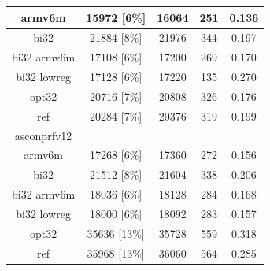 \documentclass[12pt,a4paper,italian]{report}
\begin{document}
\begin{table}[h]
\begin{tabular}{|c|c|c|c|c|}
        \hline
        armv6m & 15972 [6\%] & 16064 & 251 & 0.136 \\
        \hline
        bi32 & 21884 [8\%] & 21976 & 344 & 0.197 \\
        \hline
        bi32 armv6m & 17108 [6\%] & 17200 & 269 & 0.170 \\
        \hline
        bi32 lowreg & 17128 [6\%] & 17220 & 135 & 0.270 \\
        \hline
        opt32 & 20716 [7\%] & 20808 & 326 & 0.176 \\
        \hline
        ref & 20284 [7\%] & 20376 & 319 & 0.199 \\
        \hline
        asconprfv12 & & & & \\
        \hline
        armv6m & 17268 [6\%] & 17360 & 272 & 0.156 \\
        \hline
        bi32 & 21512 [8\%] & 21604 & 338 & 0.206 \\
        \hline
        bi32 armv6m & 18036 [6\%] & 18128 & 284 & 0.168 \\
        \hline
        bi32 lowreg & 18000 [6\%] & 18092 & 283 & 0.157 \\
        \hline
        opt32 & 35636 [13\%] & 35728 & 559 & 0.318 \\
        \hline
        ref & 35968 [13\%] & 36060 & 564 & 0.285 \\
        \hline
    \end{tabular}
\end{table}
\end{document}
